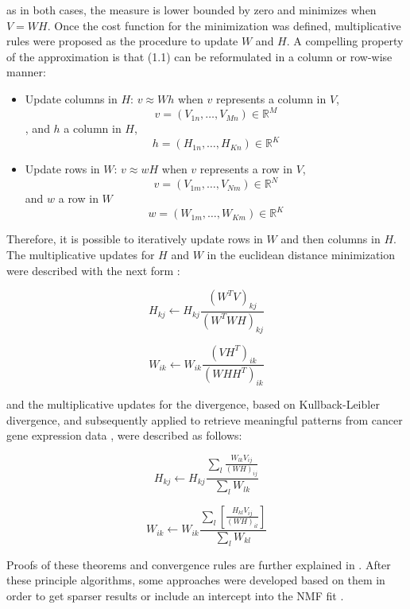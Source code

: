 as in both cases, the measure is lower bounded by zero and minimizes when \(V = WH\). Once the cost function for the minimization was defined, multiplicative rules were proposed as the procedure to update \(W\) and \(H\). A compelling property of the approximation is that (1.1) can be reformulated in a column or row-wise manner:

\begin{itemize}
    \item Update columns in \(H\): \(v \approx Wh\) when \(v\) represents a column in \(V\), \[v = (V_{1n}, \ldots , V_{Mn}) \in \mathbb{R}^M\], and \(h\) a column in \(H\), \[h = (H_{1n}, \ldots , H_{Kn}) \in \mathbb{R}^K\]
    \item Update rows in \(W\): \(v \approx wH\) when \(v\) represents a row in \(V\), \[v = (V_{1m}, \ldots , V_{Nm}) \in \mathbb{R}^N\] and \(w\) a row in \(W\) \[w = (W_{1m}, \ldots , W_{Km}) \in \mathbb{R}^K\]
\end{itemize}

Therefore, it is possible to iteratively update rows in \(W\) and then columns in \(H\). The multiplicative updates for \(H\) and \(W\) in the euclidean distance minimization were described with the next form \cite{Lee2001}:

\begin{equation}
    H_{kj} \leftarrow H_{kj} \frac{(W^T V)_{kj}}{(W^{T}WH)_{kj}	}
\end{equation}

\begin{equation}
    W_{ik} \leftarrow W_{ik} \frac{(V H^T)_{ik}}{(WHH^T)_{ik}}
\end{equation}

and the multiplicative updates for the divergence, based on Kullback-Leibler divergence, and subsequently applied to retrieve meaningful patterns from cancer gene expression data \cite{Brunet2004}, were described as follows:

\begin{equation}
    H_{kj} \leftarrow H_{kj} \frac{\sum_l \frac{W_{lk} V_{ij}}{(WH)_{ij}}}{\sum_l W_{lk}}
\end{equation}

\begin{equation}
    W_{ik} \leftarrow W_{ik} \frac{\sum_l \left[ \frac{H_{kl} V_{ij}}{(WH)_{il}} \right]}{\sum_l W_{kl}}
\end{equation}

Proofs of these theorems and convergence rules are further explained in \cite{Lee2001}. After these principle algorithms, some approaches were developed based on them in order to get sparser results \cite{Pascual-Montano2006} or include an intercept into the NMF fit \cite{Badea2008}.

